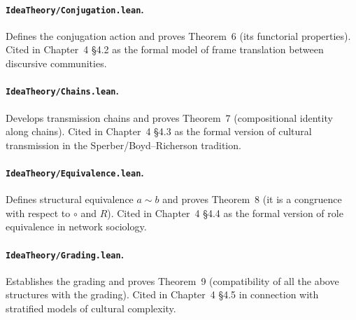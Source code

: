 \documentclass[11pt,oneside]{book}
\begin{document}
\paragraph{\texttt{IdeaTheory/Conjugation.lean}.}
Defines the conjugation action and proves Theorem~6 (its functorial
properties). Cited in Chapter~4 §4.2 as the formal model of frame
translation between discursive communities.

\paragraph{\texttt{IdeaTheory/Chains.lean}.}
Develops transmission chains and proves Theorem~7 (compositional
identity along chains). Cited in Chapter~4 §4.3 as the formal version
of cultural transmission in the Sperber/Boyd--Richerson tradition.

\paragraph{\texttt{IdeaTheory/Equivalence.lean}.}
Defines structural equivalence $a\sim b$ and proves Theorem~8 (it is
a congruence with respect to $\circ$ and $R$). Cited in Chapter~4
§4.4 as the formal version of role equivalence in network sociology.

\paragraph{\texttt{IdeaTheory/Grading.lean}.}
Establishes the grading and proves Theorem~9 (compatibility of all
the above structures with the grading). Cited in Chapter~4 §4.5 in
connection with stratified models of cultural complexity.



\end{document}
